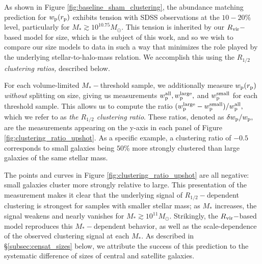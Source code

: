 \documentclass[usenatbib,usegraphicx,letterpaper]{mn2e}
\newcommand{\rhalf}{R_{1/2}}
\newcommand{\mstar}{M_{\ast}}
\newcommand{\rvir}{R_{\rm vir}}
\newcommand{\rproj}{r_{\rm p}}
\newcommand{\wproj}{w_{\rm p}}
\newcommand{\wplarge}{w_{\rm p}^{\rm large}}
\newcommand{\wpsmall}{w_{\rm p}^{\rm small}}
\newcommand{\wpall}{w_{\rm p}^{\rm all}}
\newcommand{\msun}{M_\odot}
\begin{document}
As shown in Figure \ref{fig:baseline_sham_clustering}, the abundance matching prediction for $\wproj(\rproj)$ exhibits tension with SDSS observations at the $10-20\%$ level, particularly for $\mstar\gtrsim10^{10.75}\msun.$ This tension is inherited by our $\rvir-$based model for size, which is the subject of this work, and so we wish to compare our size models to data in such a way that minimizes the role played by the underlying stellar-to-halo-mass relation. We accomplish this using the {\em $\rhalf$ clustering ratios,} described below.

For each volume-limited $\mstar-$threshold sample, we additionally measure $\wproj(\rproj)$ {\em without} splitting on size, giving us measurements $\wpall, \wplarge,$ and $\wpsmall$ for each threshold sample. This allows us to compute the ratio $(\wplarge-\wpsmall)/\wpall,$ which we refer to as {\em the $\rhalf$ clustering ratio}. These ratios, denoted as $\delta\wproj/\wproj,$ are the measurements appearing on the y-axis in each panel of Figure \ref{fig:clustering_ratio_upshot}. As a specific example, a clustering ratio of $-0.5$ corresponds to small galaxies being $50\%$ more strongly clustered than large galaxies of the same stellar mass.

The points and curves in Figure \ref{fig:clustering_ratio_upshot} are all negative: small galaxies cluster more strongly relative to large. This presentation of the measurement makes it clear that the underlying signal of $\rhalf-$dependent clustering is strongest for samples with smaller stellar mass; as $\mstar$ increases, the signal weakens and nearly vanishes for $\mstar\gtrsim10^{11}\msun.$ Strikingly, the $\rvir-$based model reproduces this $\mstar-$dependent behavior, as well as the scale-dependence of the observed clustering signal at each $\mstar.$ As described in \S\ref{subsec:censat_sizes} below, we attribute the success of this prediction to the systematic difference of sizes of central and satellite galaxies.

\end{document}

